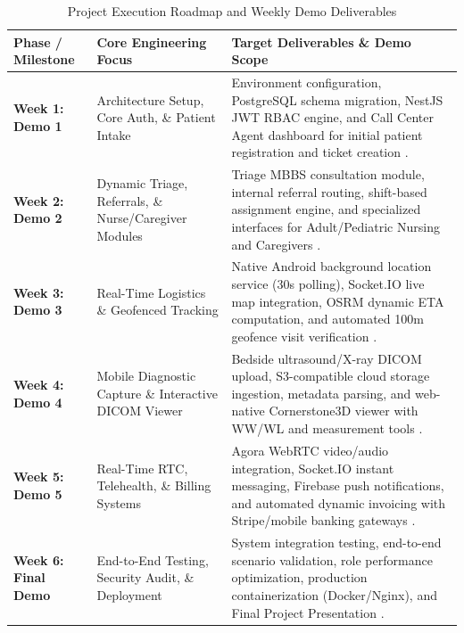 \documentclass[lettersize,onecolumn,journal]{IEEEtran}
\begin{document}
	\begin{table}[htbp]
		\centering
		\small
		\begin{tabular}{|>{\RaggedRight\arraybackslash}m{2.5cm}|>{\RaggedRight\arraybackslash}m{5cm}|>{\RaggedRight\arraybackslash}m{6.5cm}|}
			\hline
			\textbf{Phase / Milestone} & \textbf{Core Engineering Focus} & \textbf{Target Deliverables \& Demo Scope} \\ \hline
			\textbf{Week 1: Demo 1} & Architecture Setup, Core Auth, \& Patient Intake & Environment configuration, PostgreSQL schema migration, NestJS JWT RBAC engine, and Call Center Agent dashboard for initial patient registration and ticket creation \cite{srs2026, nestjs_framework, rbac_standard}. \\ \hline
			\textbf{Week 2: Demo 2} & Dynamic Triage, Referrals, \& Nurse/Caregiver Modules & Triage MBBS consultation module, internal referral routing, shift-based assignment engine, and specialized interfaces for Adult/Pediatric Nursing and Caregivers \cite{srs2026, who2016icd10, who_child_growth}. \\ \hline
			\textbf{Week 3: Demo 3} & Real-Time Logistics \& Geofenced Tracking & Native Android background location service (30s polling), Socket.IO live map integration, OSRM dynamic ETA computation, and automated 100m geofence visit verification \cite{zandbergen2009accuracy, fette2011websocket, haversine_formula, osrm_routing}. \\ \hline
			\textbf{Week 4: Demo 4} & Mobile Diagnostic Capture \& Interactive DICOM Viewer & Bedside ultrasound/X-ray DICOM upload, S3-compatible cloud storage ingestion, metadata parsing, and web-native Cornerstone3D viewer with WW/WL and measurement tools \cite{dicom2021, pacs2001, cornerstone3d}. \\ \hline
			\textbf{Week 5: Demo 5} & Real-Time RTC, Telehealth, \& Billing Systems & Agora WebRTC video/audio integration, Socket.IO instant messaging, Firebase push notifications, and automated dynamic invoicing with Stripe/mobile banking gateways \cite{fette2011websocket, stripe2024api, agorawebrtc}. \\ \hline
			\textbf{Week 6: Final Demo} & End-to-End Testing, Security Audit, \& Deployment & System integration testing, end-to-end scenario validation, role performance optimization, production containerization (Docker/Nginx), and Final Project Presentation \cite{srs2026}. \\ \hline
		\end{tabular}
		\vspace{0.5em}
		\caption{Project Execution Roadmap and Weekly Demo Deliverables}
		\label{tab:project_timeline}
	\end{table}
	
\end{document}
